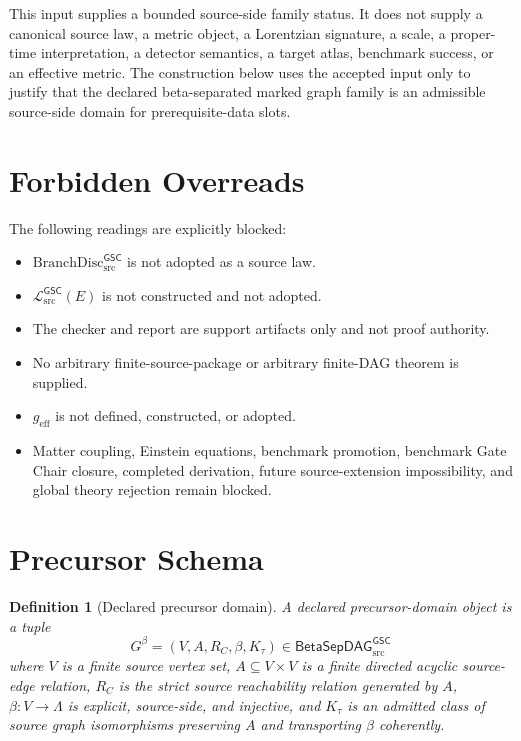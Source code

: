 \documentclass[11pt]{article}
\newcommand{\MetricData}{\mathcal{L}_{\mathrm{src}}^{\mathsf{GSC}}}
\newcommand{\BranchDisc}{\mathrm{BranchDisc}_{\mathrm{src}}^{\mathsf{GSC}}}
\newcommand{\BetaGraph}{\mathsf{BetaSepDAG}_{\mathrm{src}}^{\mathsf{GSC}}}
\newcommand{\Gbeta}{G^\beta}
\newcommand{\geff}{g_{\mathrm{eff}}}
\newtheorem{definition}{Definition}
\begin{document}
This input supplies a bounded source-side family status. It does not supply a
canonical source law, a metric object, a Lorentzian signature, a scale, a
proper-time interpretation, a detector semantics, a target atlas, benchmark
success, or an effective metric. The construction below uses the accepted
input only to justify that the declared beta-separated marked graph family is
an admissible source-side domain for prerequisite-data slots.

\section{Forbidden Overreads}

The following readings are explicitly blocked:
\begin{itemize}[leftmargin=*]
  \item \(\BranchDisc\) is not adopted as a source law.
  \item \(\MetricData(E)\) is not constructed and not adopted.
  \item The checker and report are support artifacts only and not proof
  authority.
  \item No arbitrary finite-source-package or arbitrary finite-DAG theorem is
  supplied.
  \item \(\geff\) is not defined, constructed, or adopted.
  \item Matter coupling, Einstein equations, benchmark promotion, benchmark
  Gate Chair closure, completed derivation, future source-extension
  impossibility, and global theory rejection remain blocked.
\end{itemize}

\section{Precursor Schema}

\begin{definition}[Declared precursor domain]
A declared precursor-domain object is a tuple
\[
  \Gbeta=(V,A,R_C,\beta,K_\tau)\in\BetaGraph
\]
where \(V\) is a finite source vertex set, \(A\subseteq V\times V\) is a finite
directed acyclic source-edge relation, \(R_C\) is the strict source
reachability relation generated by \(A\), \(\beta:V\to\Lambda\) is explicit,
source-side, and injective, and \(K_\tau\) is an admitted class of source
graph isomorphisms preserving \(A\) and transporting \(\beta\) coherently.
\end{definition}
\end{document}
